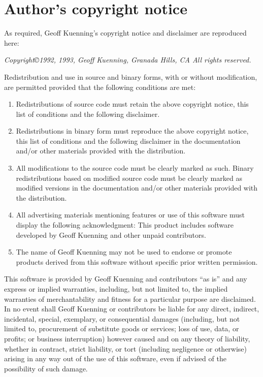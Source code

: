 \documentclass[twoside,11pt]{article}
\begin{document}
\section{Author's copyright notice}

As required, Geoff Kuenning's copyright notice and disclaimer are reproduced
here:

{\sl
Copyright\copyright 1992, 1993, Geoff Kuenning, Granada Hills, CA All rights
reserved.

Redistribution and use in source and binary forms, with or without
modification, are permitted provided that the following conditions
are met:

\begin{enumerate}

\item Redistributions of source code must retain the above copyright
   notice, this list of conditions and the following disclaimer.
\item Redistributions in binary form must reproduce the above copyright
   notice, this list of conditions and the following disclaimer in the
   documentation and/or other materials provided with the distribution.
\item All modifications to the source code must be clearly marked as
   such.  Binary redistributions based on modified source code
   must be clearly marked as modified versions in the documentation
   and/or other materials provided with the distribution.
\item All advertising materials mentioning features or use of this software
   must display the following acknowledgment:
     This product includes software developed by Geoff Kuenning and
     other unpaid contributors.
\item The name of Geoff Kuenning may not be used to endorse or promote
   products derived from this software without specific prior
   written permission.

\end{enumerate}

This software is provided by Geoff Kuenning and contributors ``as is'' and
any express or implied warranties, including, but not limited to, the
implied warranties of merchantability and fitness for a particular purpose
are disclaimed.  In no event shall Geoff Kuenning or contributors be liable
for any direct, indirect, incidental, special, exemplary, or consequential
damages (including, but not limited to, procurement of substitute goods
or services; loss of use, data, or profits; or business interruption)
however caused and on any theory of liability, whether in contract, strict
liability, or tort (including negligence or otherwise) arising in any way
out of the use of this software, even if advised of the possibility of
such damage.
}
\end{document}
